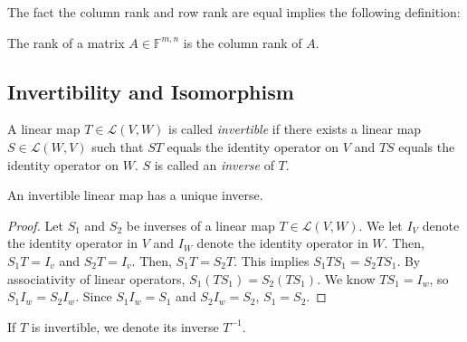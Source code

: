 \documentclass{article}
\begin{document}
The fact the column rank and row rank are equal implies the following definition:

\begin{definition}[rank]
  \label{def:rank}
  The rank of a matrix $A \in \mathbb{F}^{m, n}$ is the column rank of $A$.
\end{definition}


\subsection{Invertibility and Isomorphism}

\begin{definition}[invertible]
  \label{def:invertible}
  A linear map $T \in \mathcal{L}(V, W)$ is called \textit{invertible}
  if there exists a linear map $S \in \mathcal{L}(W, V)$ such that
  $ST$ equals the identity operator on $V$ and $TS$ equals the
  identity operator on $W$. $S$ is called an \textit{inverse} of $T$.
\end{definition}

\begin{theorem}
  \label{thm:inverse-is-unique}
  An invertible linear map has a unique inverse.
\end{theorem}
\begin{proof}
  Let $S_1$ and $S_2$ be inverses of a linear map $T \in
  \mathcal{L}(V, W)$. We let $I_V$ denote the identity operator in $V$
  and $I_W$ denote the identity operator in $W$. Then, $S_1T = I_v$
  and $S_2T = I_v$. Then, $S_1T = S_2T$. This implies $S_1TS_1 =
  S_2TS_1$. By associativity of linear operators, $S_1(TS_1) =
  S_2(TS_1)$. We know $TS_1 = I_w$, so $S_1I_w = S_2I_w$. Since
  $S_1I_w = S_1$ and $S_2I_w = S_2$, $S_1 = S_2$.
\end{proof}

\begin{definition}
  \label{def:inverse-notation}
  If $T$ is invertible, we denote its inverse $T^{-1}$.
\end{definition}
\end{document}
